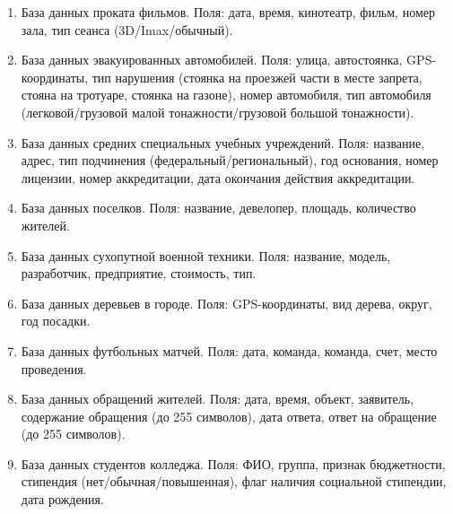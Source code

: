\begin{enumerate}
	\item База данных проката фильмов. Поля: дата, время, кинотеатр, фильм, номер зала, тип сеанса (3D/Imax/обычный).
	\item База данных эвакуированных автомобилей. Поля: улица, автостоянка, GPS-координаты, 
тип нарушения (стоянка на проезжей части в месте запрета, стояна на тротуаре, стоянка на газоне), 
номер автомобиля, тип автомобиля (легковой/грузовой малой тонажности/грузовой большой
тонажности). 
	\item База данных средних специальных учебных учреждений. Поля: название, адрес, тип подчинения (федеральный/региональный), 
год основания, номер лицензии, номер аккредитации, дата окончания действия аккредитации. 
	\item База данных поселков. Поля: название, девелопер, площадь, количество жителей.
	\item База данных сухопутной военной техники. Поля: название, модель, разработчик, предприятие, стоимость, тип. 
	\item База данных деревьев в городе. Поля: GPS-координаты, вид дерева, округ, год посадки. 
	\item База данных футбольных матчей. Поля: дата, команда, команда, счет, место проведения. 
	\item База данных обращений жителей. Поля: дата, время, объект, заявитель, содержание обращения (до 255 символов), 
дата ответа, ответ на обращение (до 255 символов).
	\item База данных студентов колледжа. Поля: ФИО, группа, признак бюджетности, 
стипендия (нет/обычная/повышенная), флаг наличия социальной стипендии, дата рождения.
\end{enumerate}

